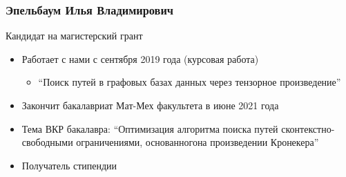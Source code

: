 \documentclass[xcolor=table,aspectratio=169]{beamer}
\begin{document}
\begin{frame}[fragile] \frametitle{Эпельбаум Илья Владимирович}
  \begin{minipage}[m]{0.45\linewidth}
  \end{minipage}\hfill
  \begin{minipage}[m]{0.54\linewidth}
  \vspace{-0.1cm}
  Кандидат на магистерский грант
  \begin{itemize}
        \item Работает с нами с сентября 2019 года (курсовая работа)
        \begin{itemize}
          \item ``Поиск путей в графовых базах данных через тензорное произведение''          
        \end{itemize}        
        \item Закончит бакалавриат Мат-Мех факультета в июне 2021 года                
        \item Тема ВКР бакалавра: ``Оптимизация алгоритма поиска путей сконтекстно-свободными ограничениями, основанногона произведении Кронекера''
        \item Получатель стипендии  
  \end{itemize}
  \end{minipage}

\end{frame}
\end{document}
